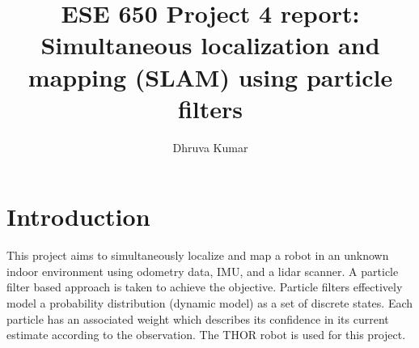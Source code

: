 \documentclass[english]{article}
\title{ESE 650 Project 4 report: Simultaneous localization and mapping (SLAM) using particle filters }
\author{Dhruva Kumar}
\date{}
\begin{document}
\maketitle

\section{Introduction}
This project aims to simultaneously localize and map a robot in an unknown indoor environment using odometry data, IMU, and a lidar scanner. A particle filter based approach is taken to achieve the objective. Particle filters effectively model a probability distribution (dynamic model) as a set of discrete states. Each particle has an associated weight which describes its confidence in its current estimate according to the observation. The THOR robot is used for this project.  
\end{document}
